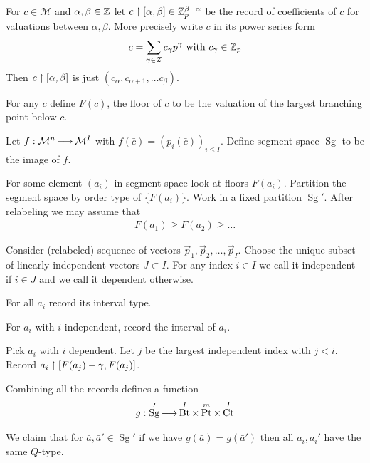 \documentclass{amsart}
\newcommand{\M}{\mathcal M}
\DeclareMathOperator{\Sg}{Sg}
\DeclareMathOperator{\Bt}{Bt}
\DeclareMathOperator{\Pt}{Pt}
\DeclareMathOperator{\Ct}{Ct}
\begin{document}
\begin{Definition}
	For $c \in \M$ and $\alpha, \beta \in \mathbb{Z}$ let $c \upharpoonright [\alpha, \beta] \in \mathbb{Z}_p^{\beta - \alpha}$ be the record of coefficients of $c$ for valuations between $\alpha, \beta$. More precisely write $c$ in its power series form
	\begin{align*}
		c = \sum_{\gamma \in Z} c_\gamma p^\gamma \text{ with } c_\gamma \in \mathbb{Z}_p
	\end{align*}
	Then $c \upharpoonright [\alpha, \beta]$ is just $(c_\alpha, c_{\alpha+1}, \ldots c_\beta)$.
\end{Definition}

For any $c$ define $F(c)$, the floor of $c$ to be the valuation of the largest branching point below $c$.

Let $f: \M^n \arr \M^I$ with $f(\bar c) = (p_i(\bar c))_{i \leq I}$.
Define segment space $\Sg$ to be the image of $f$.

For some element $(a_i)$ in segment space look at floors $F(a_i)$.
Partition the segment space by order type of $\{F(a_i)\}$.
Work in a fixed partition $\Sg'$.
After relabeling we may assume that
\begin{align*}
	F(a_1) \geq F(a_2) \geq \ldots 
\end{align*}

Consider (relabeled) sequence of vectors $\vec p_1, \vec p_2, \ldots, \vec p_I$.
Choose the unique subset of linearly independent vectors $J \subset I$.
For any index $i \in I$ we call it independent if $i \in J$ and we call it dependent otherwise.

For all $a_i$ record its interval type.

For $a_i$ with $i$ independent, record the interval of $a_i$.

Pick $a_i$ with $i$ dependent.
Let $j$ be the largest independent index with $j < i$.
Record $a_i \upharpoonright [F(a_j) - \gamma, F(a_j)]$.

Combining all the records defines a function
\begin{align*}
	g: \Sg' \arr \Bt^I \times \Pt^m \times \Ct^I
\end{align*}

We claim that for $\bar a, \bar a' \in \Sg'$ if we have $g(\bar a) = g(\bar a')$ then all $a_i, a_i'$ have the same $Q$-type.
\end{document}
